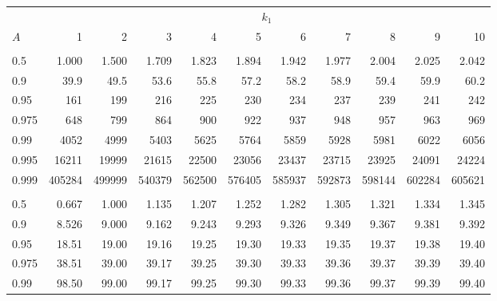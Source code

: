 \documentclass[]{article}
\begin{document}
\begin{table}[H]
\centering
\begin{tabular}{lrrrrrrrrrr}
\toprule
\multicolumn{1}{c}{ } & \multicolumn{10}{c}{$k_1$} \\
\cmidrule(l{3pt}r{3pt}){2-11}
\hspace{1.1em}$A$ & 1 & 2 & 3 & 4 & 5 & 6 & 7 & 8 & 9 & 10\\
\midrule
\addlinespace[0.3em]
\multicolumn{11}{l}{\textbf{$k_2=1$}}\\
\hspace{1em}0.5 & 1.000 & 1.500 & 1.709 & 1.823 & 1.894 & 1.942 & 1.977 & 2.004 & 2.025 & 2.042\\
\hspace{1em}0.9 & 39.9 & 49.5 & 53.6 & 55.8 & 57.2 & 58.2 & 58.9 & 59.4 & 59.9 & 60.2\\
\hspace{1em}0.95 & 161 & 199 & 216 & 225 & 230 & 234 & 237 & 239 & 241 & 242\\
\hspace{1em}0.975 & 648 & 799 & 864 & 900 & 922 & 937 & 948 & 957 & 963 & 969\\
\hspace{1em}0.99 & 4052 & 4999 & 5403 & 5625 & 5764 & 5859 & 5928 & 5981 & 6022 & 6056\\
\hspace{1em}0.995 & 16211 & 19999 & 21615 & 22500 & 23056 & 23437 & 23715 & 23925 & 24091 & 24224\\
\hspace{1em}0.999 & 405284 & 499999 & 540379 & 562500 & 576405 & 585937 & 592873 & 598144 & 602284 & 605621\\
\addlinespace[0.3em]
\multicolumn{11}{l}{\textbf{$k_2=2$}}\\
\hspace{1em}0.5 & 0.667 & 1.000 & 1.135 & 1.207 & 1.252 & 1.282 & 1.305 & 1.321 & 1.334 & 1.345\\
\hspace{1em}0.9 & 8.526 & 9.000 & 9.162 & 9.243 & 9.293 & 9.326 & 9.349 & 9.367 & 9.381 & 9.392\\
\hspace{1em}0.95 & 18.51 & 19.00 & 19.16 & 19.25 & 19.30 & 19.33 & 19.35 & 19.37 & 19.38 & 19.40\\
\hspace{1em}0.975 & 38.51 & 39.00 & 39.17 & 39.25 & 39.30 & 39.33 & 39.36 & 39.37 & 39.39 & 39.40\\
\hspace{1em}0.99 & 98.50 & 99.00 & 99.17 & 99.25 & 99.30 & 99.33 & 99.36 & 99.37 & 99.39 & 99.40\\

\end{tabular}
\end{table}
\end{document}
